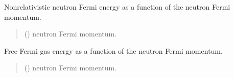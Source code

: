 \documentclass[letterpaper,10pt,english]{sphinxmanual}
\begin{document}

\begin{fulllineitems}
\label{\detokenize{source/api/setup_matter_ffg:nucleardatapy.matter.setup_ffg.eF_n_nr}}
\pysigstartsignatures
{}
\pysigstopsignatures
\sphinxAtStartPar
Non\sphinxhyphen{}relativistic neutron Fermi energy as a function of the neutron Fermi momentum.
\begin{quote}\begin{description}
\sphinxAtStartPar
{} () \textendash{} neutron Fermi momentum.

\end{description}\end{quote}

\end{fulllineitems}


\begin{fulllineitems}
\label{\detokenize{source/api/setup_matter_ffg:nucleardatapy.matter.setup_ffg.effg_NM_nr}}
\pysigstartsignatures
{}
\pysigstopsignatures
\sphinxAtStartPar
Free Fermi gas energy as a function of the neutron Fermi momentum.
\begin{quote}\begin{description}
\sphinxAtStartPar
{} () \textendash{} neutron Fermi momentum.

\end{description}\end{quote}

\end{fulllineitems}
\end{document}
